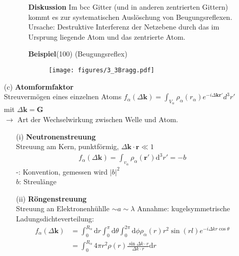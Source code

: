 \begin{itemize}
\begin{itemize}
\begin{itemize}
            \item[\textbf{Diskussion}]
            Im bcc Gitter (und in anderen zentrierten Gittern) kommt es zur systematischen Auslöschung von Beugungsreflexen.\\
            Ursache: Destruktive Interferenz der Netzebene durch das im Ursprung liegende Atom und das zentrierte Atom.
            \item[\textbf{Beispiel}(100)] (Beugungsreflex)
                \begin{figure}[H]
                    \centering
                    \texttt{[image: figures/3\_3Bragg.pdf]}
                    \caption{}
                    \label{}
                \end{figure}
        \end{itemize}
    \end{itemize}
    \item[(c)] \textbf{Atomformfaktor}\\
    Streuvermögen eines einzelnen Atoms $f_\alpha(\Delta \textbf{k}) = \int_{V_\alpha}\rho_\alpha(r_\alpha)e^{-i\Delta \textbf{k} \textbf{r}'} d^3r'$ \\
    {\footnotesize mit $\Delta \textbf{k} = \textbf{G}$}\\
    $\rightarrow$ Art der Wechselwirkung zwischen Welle und Atom.
    \begin{itemize}
        \item[(i)] \textbf{Neutronenstreuung}\\
        Streuung am Kern, punktförmig, $\Delta \textbf{k} \cdot \textbf{r} \ll 1$
        \begin{align*}
            f_{\alpha} (\Delta \textbf{k}) = \int_{v_{\alpha}} \rho_{\alpha} (\textbf{r}') \mathrm{d}^3r' = -b
        \end{align*}
        -: Konvention, gemessen wird $|b|^2$\\
        $b$: Streulänge
        \item[(ii)] \textbf{Röngenstreuung}\\
        Streuung an Elektronenhühlle $\sim a \sim \lambda$
        Annahme: kugelsymmetrische Ladungsdichteverteilung:
        \begin{align}
            f_\alpha(\Delta \textbf{k}) &= 
            \int_{0}^{R_\alpha} \mathrm{d}r
            \int_{0}^{\pi} \mathrm{d}\theta
            \int_{0}^{2\pi} \mathrm{d}\phi \rho_\alpha(r) r^2 \sin(rl)e^{-i\Delta k r \cos{\theta}}\nonumber\\
            &= \int_{0}^{R_\alpha}4\pi r^2 \rho(r)\frac{\sin{\Delta k \cdot r}}{\Delta k \cdot r} \mathrm{d}r \label{eq:rstr}

\end{align}
\end{itemize}
\end{itemize}
